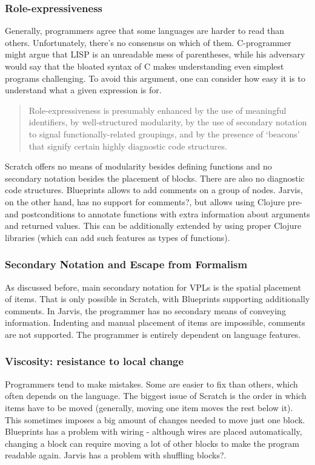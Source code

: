 \documentclass[11pt]{scrartcl}
\begin{document}
\subsubsection{Role-expressiveness}
Generally, programmers agree that some languages are harder to read than others. Unfortunately, there’s no consensus on which of them. C-programmer might argue that LISP is an unreadable mess of parentheses, while his adversary would say that the bloated syntax of C makes understanding even simplest programs challenging. To avoid this argument, one can consider how easy it is to understand what a given expression is for.
\blockquote[{\cite{Green96UsabilityAnalysis}}]{Role-expressiveness is presumably enhanced by the use of meaningful identifiers, by well-structured modularity, by the use of secondary notation to signal functionally-related groupings, and by the presence of ‘beacons’ that signify certain highly diagnostic code structures.}
Scratch offers no means of modularity besides defining functions and no secondary notation besides the placement of blocks. There are also no diagnostic code structures. Blueprints allows to add comments on a group of nodes. Jarvis, on the other hand, has no support for comments{?}, but allows using Clojure pre- and postconditions to annotate functions with extra information about arguments and returned values. This can be additionally extended by using proper Clojure libraries (which can add such features as types of functions).
\subsubsection{Secondary Notation and Escape from Formalism}
As discussed before, main secondary notation for VPLs is the spatial placement of items. That is only possible in Scratch, with Blueprints supporting additionally comments. In Jarvis, the programmer has no secondary means of conveying information. Indenting and manual placement of items are impossible, comments are not supported. The programmer is entirely dependent on language features.
\subsubsection{Viscosity: resistance to local change}
Programmers tend to make mistakes. Some are easier to fix than others, which often depends on the language. The biggest issue of Scratch is the order in which items have to be moved (generally, moving one item moves the rest below it). This sometimes imposes a big amount of changes needed to move just one block. Blueprints has a problem with wiring - although wires are placed automatically, changing a block can require moving a lot of other blocks to make the program readable again. Jarvis has a problem with shuffling blocks{?}.
\end{document}
